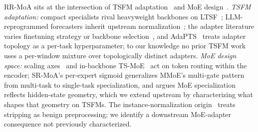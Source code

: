 \documentclass{article}
\begin{document}
RR-MoA sits at the intersection of TSFM adaptation~\citep{wen2023tssurvey} and MoE design~\citep{cai2024moesurvey}. \emph{TSFM adaptation:} compact specialists rival heavyweight backbones on LTSF~\citep{wu2025srsnet, wang2025timemixerpp, xu2024fits, chen2023tsmixer, fu2025selective}; LLM-reprogrammed forecasters inherit upstream normalization~\citep{jin2024timellm, zhou2023onefitsall, liu2024autotimes}; the adapter literature varies finetuning strategy or backbone selection~\citep{houlsby2019adapters, qiao2025msft, zhao2025prune, faw2025icf, ning2025tsrag, gupta2024beyondlora, zhang2025template, woo2024gifteval}, and AdaPTS~\citep{benechehab2025adapts} treats adapter topology as a per-task hyperparameter; to our knowledge no prior TSFM work uses a per-window mixture over topologically distinct adapters. \emph{MoE design space:} scaling axes~\citep{lepikhin2021gshard, riquelme2021vmoe, komatsuzaki2023sparseupcycling, raposo2024mod, jiang2024mixtral, zhu2024llamamoe, dai2024deepseekmoe} and in-backbone TS-MoE~\citep{shi2024timemoe, he2025sempo} act on token routing within the encoder; SR-MoA's per-expert sigmoid generalizes MMoE's multi-gate pattern~\citep{ma2018mmoe} from multi-task to single-task specialization, and \citet{wang2026myth} argues MoE specialization reflects hidden-state geometry, which we extend upstream by characterizing what shapes that geometry on TSFMs. The instance-normalization origin~\citep{ulyanov2016instancenorm} treats stripping as benign preprocessing; we identify a downstream MoE-adapter consequence not previously characterized.
\end{document}
